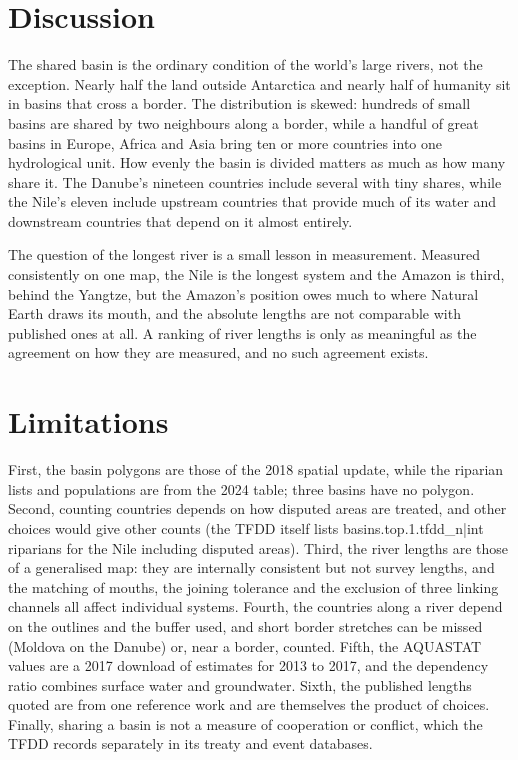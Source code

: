 \documentclass[11pt,a4paper]{article}
\begin{document}
\section{Discussion}
The shared basin is the ordinary condition of the world's large rivers, not the exception. Nearly half the land outside Antarctica and nearly half of humanity sit in basins that cross a border. The distribution is skewed: hundreds of small basins are shared by two neighbours along a border, while a handful of great basins in Europe, Africa and Asia bring ten or more countries into one hydrological unit. How evenly the basin is divided matters as much as how many share it. The Danube's nineteen countries include several with tiny shares, while the Nile's eleven include upstream countries that provide much of its water and downstream countries that depend on it almost entirely.

The question of the longest river is a small lesson in measurement. Measured consistently on one map, the Nile is the longest system and the Amazon is third, behind the Yangtze, but the Amazon's position owes much to where Natural Earth draws its mouth, and the absolute lengths are not comparable with published ones at all. A ranking of river lengths is only as meaningful as the agreement on how they are measured, and no such agreement exists.

\section{Limitations}
First, the basin polygons are those of the 2018 spatial update, while the riparian lists and populations are from the 2024 table; three basins have no polygon. Second, counting countries depends on how disputed areas are treated, and other choices would give other counts (the TFDD itself lists {{basins.top.1.tfdd_n|int}} riparians for the Nile including disputed areas). Third, the river lengths are those of a generalised map: they are internally consistent but not survey lengths, and the matching of mouths, the joining tolerance and the exclusion of three linking channels all affect individual systems. Fourth, the countries along a river depend on the outlines and the buffer used, and short border stretches can be missed (Moldova on the Danube) or, near a border, counted. Fifth, the AQUASTAT values are a 2017 download of estimates for 2013 to 2017, and the dependency ratio combines surface water and groundwater. Sixth, the published lengths quoted are from one reference work and are themselves the product of choices. Finally, sharing a basin is not a measure of cooperation or conflict, which the TFDD records separately in its treaty and event databases.
\end{document}
